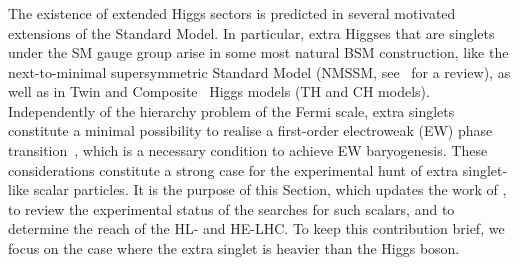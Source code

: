\subsubsection{}
%



The existence of extended Higgs sectors is predicted in several motivated extensions of the Standard Model.
In particular, extra Higgses that are singlets under the SM gauge group arise in some most natural BSM construction, like the next-to-minimal supersymmetric Standard Model (NMSSM, see~\cite{Ellwanger:2009dp} for a review), as well as in Twin \cite{Chacko:2005pe} and Composite~\cite{Contino:2010rs,Panico:2015jxa} Higgs models (TH and CH models).
Independently of the hierarchy problem of the Fermi scale, extra singlets constitute a minimal possibility to realise a first-order electroweak (EW) phase transition~\cite{Pietroni:1992in,Curtin:2014jma,Craig:2014lda}, which is a necessary condition to achieve EW baryogenesis.
These considerations constitute a strong case for the experimental hunt of extra singlet-like scalar particles.
It is the purpose of this Section, which updates the work of , to review the experimental status of the searches for such scalars, and to determine the reach of the HL- and HE-LHC. To keep this contribution brief, we focus on the case where the extra singlet is heavier than the Higgs boson.

